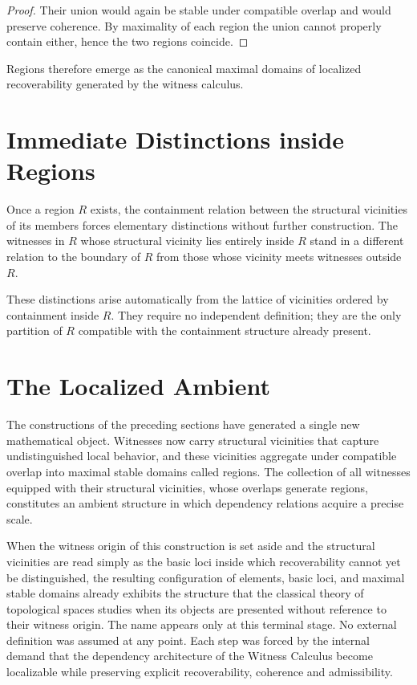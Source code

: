\documentclass[12pt,anyside]{book}
\begin{document}
\begin{proof}
Their union would again be stable under compatible overlap and would preserve coherence. By maximality of each region the union cannot properly contain either, hence the two regions coincide.
\end{proof}

Regions therefore emerge as the canonical maximal domains of localized recoverability generated by the witness calculus.

\section{Immediate Distinctions inside Regions}
Once a region $R$ exists, the containment relation between the structural vicinities of its members forces elementary distinctions without further construction. The witnesses in $R$ whose structural vicinity lies entirely inside $R$ stand in a different relation to the boundary of $R$ from those whose vicinity meets witnesses outside $R$. 

These distinctions arise automatically from the lattice of vicinities ordered by containment inside $R$. They require no independent definition; they are the only partition of $R$ compatible with the containment structure already present.

\section{The Localized Ambient}
The constructions of the preceding sections have generated a single new mathematical object. Witnesses now carry structural vicinities that capture undistinguished local behavior, and these vicinities aggregate under compatible overlap into maximal stable domains called regions. The collection of all witnesses equipped with their structural vicinities, whose overlaps generate regions, constitutes an ambient structure in which dependency relations acquire a precise scale. 

When the witness origin of this construction is set aside and the structural vicinities are read simply as the basic loci inside which recoverability cannot yet be distinguished, the resulting configuration of elements, basic loci, and maximal stable domains already exhibits the structure that the classical theory of topological spaces studies when its objects are presented without reference to their witness origin. The name appears only at this terminal stage. No external definition was assumed at any point. Each step was forced by the internal demand that the dependency architecture of the Witness Calculus become localizable while preserving explicit recoverability, coherence and admissibility.
\end{document}
